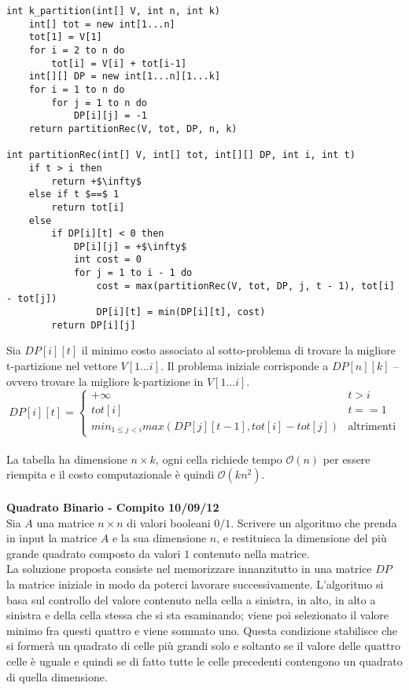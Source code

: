 \documentclass[../cheatSheetAlgoritmi.tex]{subfiles}
\begin{document}
\begin{lstlisting}[caption=k-partizioni]
int k_partition(int[] V, int n, int k)
	int[] tot = new int[1...n]
	tot[1] = V[1]
	for i = 2 to n do
		tot[i] = V[i] + tot[i-1]
	int[][] DP = new int[1...n][1...k]
	for i = 1 to n do
		for j = 1 to n do
			DP[i][j] = -1
	return partitionRec(V, tot, DP, n, k)
	
int partitionRec(int[] V, int[] tot, int[][] DP, int i, int t)
	if t > i then
		return +$\infty$
	else if t $==$ 1
		return tot[i]
	else
		if DP[i][t] < 0 then
			DP[i][j] = +$\infty$
			int cost = 0
			for j = 1 to i - 1 do
				cost = max(partitionRec(V, tot, DP, j, t - 1), tot[i] - tot[j])
				DP[i][t] = min(DP[i][t], cost)
		return DP[i][j]
\end{lstlisting}
\newpage
\noindent
Sia $DP[i][t]$ il minimo costo associato al sotto-problema di trovare la migliore t-partizione nel vettore $V[1...i]$. Il problema iniziale corrisponde a $DP[n][k]$ – ovvero trovare la migliore k-partizione in $V[1...i]$.
\begin{equation*}
    DP[i][t]=\begin{cases}
        +\infty & \text{$t > i$}\\
        tot[i] & \text{$t == 1$} \\
        min_{1 \leq j < i}max(DP[j][t-1], tot[i] - tot[j]) & \text{altrimenti}
    \end{cases}
\end{equation*}
\\La tabella ha dimensione $n \times k$, ogni cella richiede tempo $\mathcal{O}(n)$ per essere riempita e il costo computazionale è quindi $\mathcal{O}(kn^{2})$.\\\\
\textbf{Quadrato Binario - Compito 10/09/12}\\
Sia $A$ una matrice $n \times n$ di valori booleani $0/1$. Scrivere un algoritmo che prenda in input la matrice $A$ e la sua dimensione $n$, e restituisca la dimensione del più grande quadrato composto da valori $1$ contenuto nella matrice.\\
La soluzione proposta consiste nel memorizzare innanzitutto in una matrice $DP$ la matrice iniziale in modo da poterci lavorare successivamente. L'algoritmo si basa sul controllo del valore contenuto nella cella a sinistra, in alto, in alto a sinistra e della cella stessa che si sta esaminando; viene poi selezionato il valore minimo fra questi quattro e viene sommato uno. Questa condizione stabilisce che si formerà un quadrato di celle più grandi solo e soltanto se il valore delle quattro celle è uguale e quindi se di fatto tutte le celle precedenti contengono un quadrato di quella dimensione.
\end{document}
